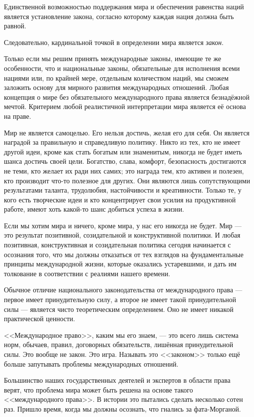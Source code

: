 Единственной возможностью поддержания мира и обеспечения равенства наций является установление закона, согласно которому каждая нация должна быть равной.

Следовательно, кардинальной точкой в определении мира является \textit{закон}.

Только если мы решим принять международные законы, имеющие те же особенности, что и национальные законы, обязательные для исполнения всеми нациями или, по крайней мере, отдельным количеством наций, мы сможем заложить основу для мирного развития международных отношений. Любая концепция о  мире без обязательного международного права является безнадёжной мечтой. Критерием любой реалистичной интерпретации мира является её основа на праве.

Мир не является самоцелью. Его нельзя достичь, желая его для себя. Он является наградой за правильную и справедливую политику. Никто из тех, кто не имеет другой идеи, кроме как стать богатым или знаменитым, никогда не будет иметь шанса достичь своей цели. Богатство, слава, комфорт, безопасность достигаются не теми, кто желает их ради них самих; это награда тем, кто активен и полезен, кто производит что-то полезное для других. Они являются лишь сопутствующими результатами таланта, трудолюбия, настойчивости и креативности. Только те, у кого есть творческие идеи и кто концентрирует свои усилия на продуктивной работе, имеют хоть какой-то шанс добиться успеха в жизни.

Если мы хотим мира и ничего, кроме мира, у нас его никогда не будет. Мир — это результат позитивной, созидательной и конструктивной политики. И любая позитивная, конструктивная и созидательная политика сегодня начинается с осознания того, что мы должны отказаться от тех взглядов на фундаментальные принципы международной жизни, которые оказались устаревшими, и дать им толкование в соответствии с реалиями нашего времени.

Обычное отличие национального законодательства от международного права — первое имеет принудительную силу, а второе не имеет такой принудительной силы — является чисто теоретическим определением. Оно не имеет никакой практической ценности.

<<Международное право>>, каким мы его знаем, — это всего лишь система норм, обычаев, правил, договорных обязательств, лишённая принудительной силы. Это вообще не закон. Это игра. Называть это <<законом>> только ещё больше запутывать проблемы международных отношений.

Большинство наших государственных деятелей и экспертов в области права верят, что проблема мира может быть решена на основе такого <<международного права>>. В истории это пытались сделать несколько сотен раз. Пришло время, когда мы должны осознать, что гнались за фата-Морганой.

